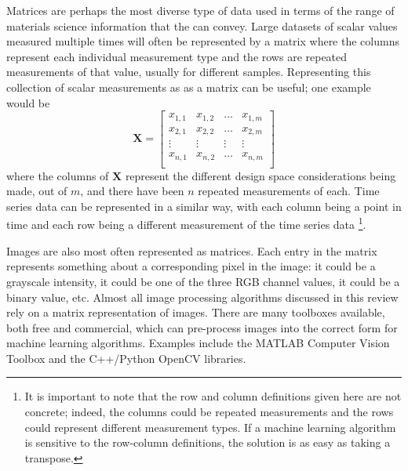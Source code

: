 Matrices are perhaps the most diverse type of data used in terms of the range of materials science information that the can convey. Large datasets of scalar values measured multiple times will often be represented by a matrix where the columns represent each individual measurement type and the rows are repeated measurements of that value, usually for different samples. Representing this collection of scalar measurements as as a matrix can be useful; one example would be
\begin{equation}
	\mathbf{X} = \begin{bmatrix} x_{1,1} & x_{1,2} & \hdots & x_{1,m} \\
						x_{2,1} & x_{2,2} & \hdots & x_{2,m} \\
						\vdots & \vdots & \vdots & \vdots \\
						x_{n,1} & x_{n,2} & \hdots & x_{n,m} \\
				\end{bmatrix}
	\label{matrix}
\end{equation}
where the columns of $\mathbf{X}$ represent the different design space considerations being made, out of $m$, and there have been $n$ repeated measurements of each. Time series data can be represented in a similar way, with each column being a point in time and each row being a different measurement of the time series data \footnote{It is important to note that the row and column definitions given here are not concrete; indeed, the columns could be repeated measurements and the rows could represent different measurement types. If a machine learning algorithm is sensitive to the row-column definitions, the solution is as easy as taking a transpose.}.

Images are also most often represented as matrices. Each entry in the matrix represents something about a corresponding pixel in the image: it could be a grayscale intensity, it could be one of the three RGB channel values, it could be a binary value, etc. Almost all image processing algorithms discussed in this review rely on a matrix representation of images. There are many toolboxes available, both free and commercial, which can pre-process images into the correct form for machine learning algorithms. Examples include the MATLAB Computer Vision Toolbox and the C++/Python OpenCV libraries.

